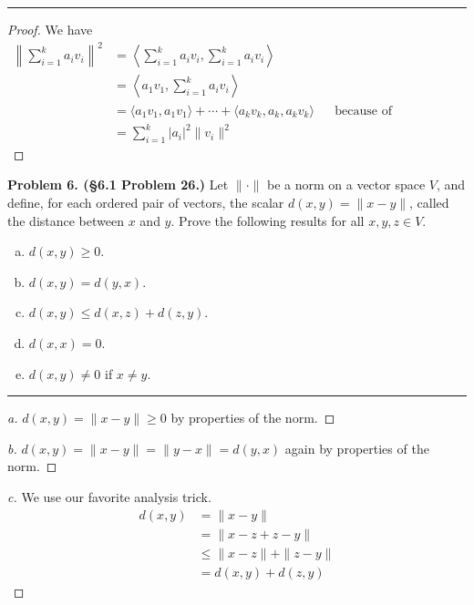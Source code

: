 \documentclass[leqno]{article}
\theoremstyle{nonumberplain}
\newtheorem{proof}{Proof}
\begin{document}
\noindent\rule[0.5ex]{\linewidth}{1pt}

\begin{proof}
We have
\begin{align*}
\left\|\sum_{i=1}^k a_i v_i \right\|^2&= \left\langle \sum_{i=1}^k a_i v_i, \sum_{i=1}^k a_i v_i \right\rangle\\
&= \left\langle a_1 v_1, \sum_{i=1}^k a_i v_i \right\rangle\\
&= \langle a_1 v_1, a_1 v_1 \rangle + \cdots + \langle a_k v_k, a_k, a_k v_k \rangle && \textrm{because of orthonormality}\\
&= \sum_{i=1}^k |a_i|^2 \|v_i\|^2
\end{align*}
\end{proof}

\pagebreak






\noindent\textbf{Problem 6. (\S 6.1 Problem 26.)} Let $\|\cdot \|$ be a norm on a vector space $V$, and define, for each ordered pair of vectors, the scalar $d(x,y)=\|x-y\|$, called the distance between $x$ and $y$. Prove the following results for all $x,y,z \in V$.
\begin{enumerate}[(a)]
\item $d(x,y)\geq 0$.
\item $d(x,y)=d(y,x)$.
\item $d(x,y)\leq d(x,z)+d(z,y)$.
\item $d(x,x)=0$.
\item $d(x,y)\neq 0$ if $x\neq y$.
\end{enumerate}

\noindent\rule[0.5ex]{\linewidth}{1pt}

\begin{proof}[a]
$d(x,y)=\|x-y\|\geq 0$ by properties of the norm.
\end{proof}

\begin{proof}[b]
$d(x,y)=\|x-y\|=\|y-x\|=d(y,x)$ again by properties of the norm.
\end{proof}

\begin{proof}[c]
We use our favorite analysis trick.
\begin{align*}
d(x,y)&=\|x-y\|\\
&= \|x-z+z-y\|\\
&\leq \|x-z\|+\|z-y\|\\
&=d(x,y)+d(z,y)
\end{align*}
\end{proof}
\end{document}
